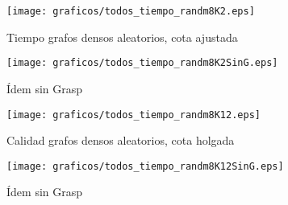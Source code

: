 \begin{figure}[H]
    \begin{minipage}{0.5\linewidth}
      \texttt{[image: graficos/todos\_tiempo\_randm8K2.eps]}
      \caption{Tiempo grafos densos aleatorios, cota ajustada}\label{fig:extra3}
    \end{minipage}
    \hfill
    \begin{minipage}{0.5\linewidth}
      \texttt{[image: graficos/todos\_tiempo\_randm8K2SinG.eps]}
      \caption{Ídem sin Grasp}\label{fig:extra4}
    \end{minipage}    
\end{figure}

\begin{figure}[H]
    \begin{minipage}{0.5\linewidth}
      \texttt{[image: graficos/todos\_tiempo\_randm8K12.eps]}
      \caption{Calidad grafos densos aleatorios, cota holgada}\label{fig:extra5}
    \end{minipage}
    \hfill
    \begin{minipage}{0.5\linewidth}
      \texttt{[image: graficos/todos\_tiempo\_randm8K12SinG.eps]}
      \caption{Ídem sin Grasp}\label{fig:extra6}
    \end{minipage}    
\end{figure}